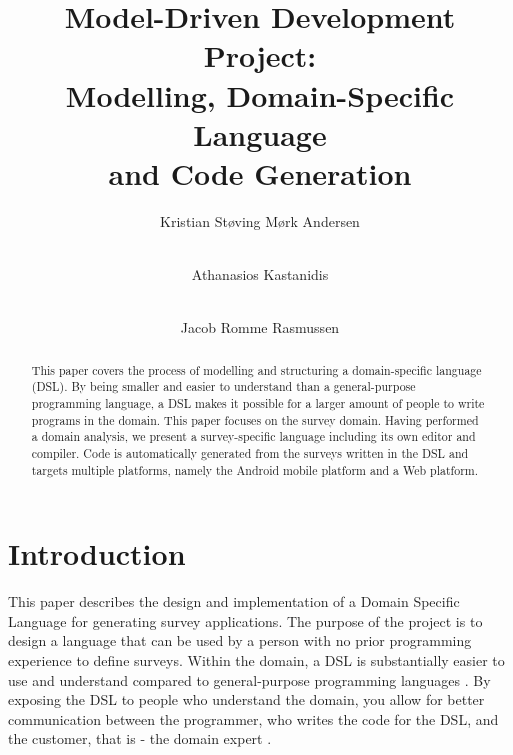 \documentclass[runningheads]{llncs}
\begin{document}
\mainmatter  %

\title{Model-Driven Development Project:\\ Modelling, Domain-Specific Language\\ and Code Generation}


\author{Kristian Støving Mørk Andersen \and \\ Athanasios Kastanidis \and \\ Jacob Romme Rasmussen}
%

\institute{\mailsa\\}

\maketitle


\begin{abstract}
This paper covers the process of modelling and structuring a domain-specific language (DSL). By being smaller and easier to understand than a general-purpose programming language, a DSL makes it possible for a larger amount of people to write programs in the domain. This paper focuses on the survey domain. Having performed a domain analysis, we present a survey-specific language including its own editor and compiler. Code is automatically generated from the surveys written in the DSL and targets multiple platforms, namely the Android mobile platform and a Web platform. 
\end{abstract}

\section{Introduction}
This paper describes the design and implementation of a Domain Specific Language for generating survey applications. The purpose of the project is to design a language that can be used by a person with no prior programming experience to define surveys. Within the domain, a DSL is substantially easier to use and understand compared to general-purpose programming languages \cite{mernik}. By exposing the DSL to people who understand the domain, you allow for better communication between the programmer, who writes the code for the DSL, and the customer, that is - the domain expert \cite{fowler}. 
\end{document}
